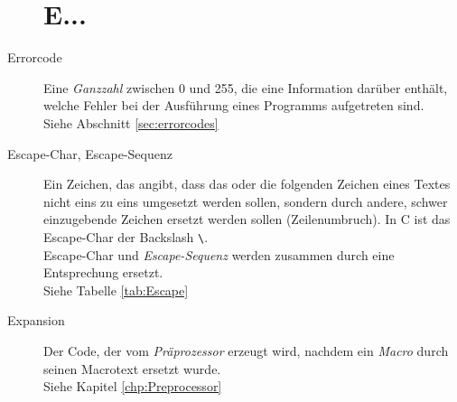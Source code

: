 \begin{appendices}
\begin{description}
\section*{E...}
\item[Errorcode] Eine \emph{Ganzzahl} zwischen 0 und 255, die eine Information darüber enthält, welche
	Fehler bei der Ausführung eines Programms aufgetreten sind.\\
	Siehe Abschnitt \ref{sec:errorcodes}
\item[Escape-Char, Escape-Sequenz] Ein Zeichen, das angibt, dass das oder die folgenden Zeichen eines
	Textes nicht eins zu eins umgesetzt werden sollen, sondern durch andere, schwer einzugebende Zeichen
	ersetzt	werden sollen (\eg Zeilenumbruch). In C ist das Escape-Char der Backslash
	\texttt{\textbackslash}.\\
	Escape-Char und \emph{Escape-Sequenz} werden zusammen durch eine Entsprechung ersetzt.\\
	Siehe Tabelle \ref{tab:Escape}
\item[Expansion] Der Code, der vom \emph{Präprozessor} erzeugt wird, nachdem ein \emph{Macro} durch
	seinen Macrotext ersetzt wurde.\\
	Siehe Kapitel \ref{chp:Preprocessor}


\end{description}
\end{appendices}
